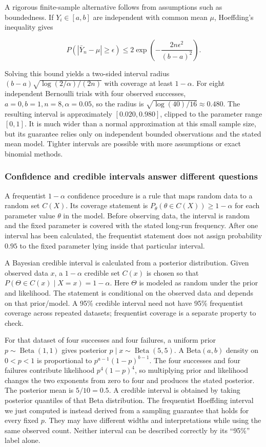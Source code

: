 A rigorous finite-sample alternative follows from assumptions such as boundedness. If \(Y_i\in[a,b]\) are independent with common mean \(\mu\), Hoeffding's inequality gives

\[
P(|\bar Y_n-\mu|\ge\epsilon)\le2\exp\left(-\frac{2n\epsilon^2}{(b-a)^2}\right).
\]

Solving this bound yields a two-sided interval radius \((b-a)\sqrt{\log(2/\alpha)/(2n)}\) with coverage at least \(1-\alpha\). For eight independent Bernoulli trials with four observed successes, \(a=0,b=1,n=8,\alpha=0.05\), so the radius is \(\sqrt{\log(40)/16}\approx0.480\). The resulting interval is approximately \([0.020,0.980]\), clipped to the parameter range \([0,1]\). It is much wider than a normal approximation at this small sample size, but its guarantee relies only on independent bounded observations and the stated mean model. Tighter intervals are possible with more assumptions or exact binomial methods.

\subsubsection{Confidence and credible intervals answer different questions}\label{confidence-and-credible-intervals-answer-different-questions}

A frequentist \(1-\alpha\) confidence procedure is a rule that maps random data to a random set \(C(X)\). Its coverage statement is \(P_\theta(\theta\in C(X))\ge1-\alpha\) for each parameter value \(\theta\) in the model. Before observing data, the interval is random and the fixed parameter is covered with the stated long-run frequency. After one interval has been calculated, the frequentist statement does not assign probability \(0.95\) to the fixed parameter lying inside that particular interval.

A Bayesian credible interval is calculated from a posterior distribution. Given observed data \(x\), a \(1-\alpha\) credible set \(C(x)\) is chosen so that \(P(\Theta\in C(x)\mid X=x)=1-\alpha\). Here \(\Theta\) is modeled as random under the prior and likelihood. The statement is conditional on the observed data and depends on that prior/model. A 95\% credible interval need not have 95\% frequentist coverage across repeated datasets; frequentist coverage is a separate property to check.

For that dataset of four successes and four failures, a uniform prior \(p\sim\operatorname{Beta}(1,1)\) gives posterior \(p\mid x\sim\operatorname{Beta}(5,5)\). A Beta\((a,b)\) density on \(0<p<1\) is proportional to \(p^{a-1}(1-p)^{b-1}\). The four successes and four failures contribute likelihood \(p^4(1-p)^4\), so multiplying prior and likelihood changes the two exponents from zero to four and produces the stated posterior. The posterior mean is \(5/10=0.5\). A credible interval is obtained by taking posterior quantiles of that Beta distribution. The frequentist Hoeffding interval we just computed is instead derived from a sampling guarantee that holds for every fixed \(p\). They may have different widths and interpretations while using the same observed count. Neither interval can be described correctly by its ``95\%'' label alone.

